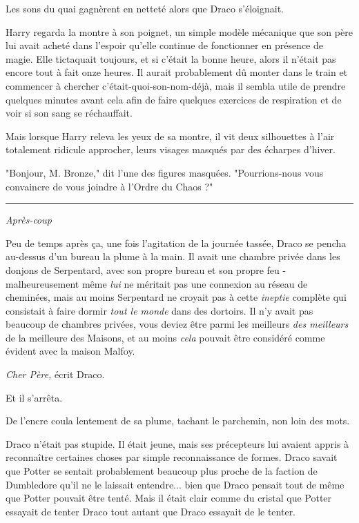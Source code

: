 Les sons du quai gagnèrent en netteté alors que Draco s'éloignait.

Harry regarda la montre à son poignet, un simple modèle mécanique que son père lui avait acheté dans l'espoir qu'elle continue de fonctionner en présence de magie. Elle tictaquait toujours, et si c'était la bonne heure, alors il n'était pas encore tout à fait onze heures. Il aurait probablement dû monter dans le train et commencer à chercher c'était-quoi-son-nom-déjà, mais il sembla utile de prendre quelques minutes avant cela afin de faire quelques exercices de respiration et de voir si son sang se réchauffait.

Mais lorsque Harry releva les yeux de sa montre, il vit deux silhouettes à l'air totalement ridicule approcher, leurs visages masqués par des écharpes d'hiver.

"Bonjour, M. Bronze," dit l'une des figures masquées. "Pourrions-nous vous convaincre de vous joindre à l'Ordre du Chaos ?"
\par\noindent\rule{\textwidth}{0.4pt}
\emph{Après-coup} 

Peu de temps après ça, une fois l'agitation de la journée tassée, Draco se pencha au-dessus d'un bureau la plume à la main. Il avait une chambre privée dans les donjons de Serpentard, avec son propre bureau et son propre feu - malheureusement même \emph{lui}  ne méritait pas une connexion au réseau de cheminées, mais au moins Serpentard ne croyait pas à cette \emph{ineptie } complète qui consistait à faire dormir \emph{tout le monde}  dans des dortoirs. Il n'y avait pas beaucoup de chambres privées, vous deviez être parmi les meilleurs \emph{des meilleurs}  de la meilleure des Maisons, et au moins \emph{cela}  pouvait être considéré comme évident avec la maison Malfoy.

\emph{Cher Père,}  écrit Draco.

Et il s'arrêta.

De l'encre coula lentement de sa plume, tachant le parchemin, non loin des mots.

Draco n'était pas stupide. Il était jeune, mais ses précepteurs lui avaient appris à reconnaître certaines choses par simple reconnaissance de formes. Draco savait que Potter se sentait probablement beaucoup plus proche de la faction de Dumbledore qu'il ne le laissait entendre... bien que Draco pensait tout de même que Potter pouvait être tenté. Mais il était clair comme du cristal que Potter essayait de tenter Draco tout autant que Draco essayait de le tenter.

